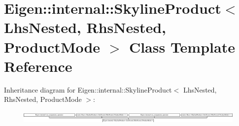 \hypertarget{class_eigen_1_1internal_1_1_skyline_product}{}\section{Eigen\+:\+:internal\+:\+:Skyline\+Product$<$ Lhs\+Nested, Rhs\+Nested, Product\+Mode $>$ Class Template Reference}
\label{class_eigen_1_1internal_1_1_skyline_product}
Inheritance diagram for Eigen\+:\+:internal\+:\+:Skyline\+Product$<$ Lhs\+Nested, Rhs\+Nested, Product\+Mode $>$\+:\begin{figure}[H]
\begin{center}
\leavevmode
\includegraphics[height=0.654206cm]{class_eigen_1_1internal_1_1_skyline_product}
\end{center}
\end{figure}
